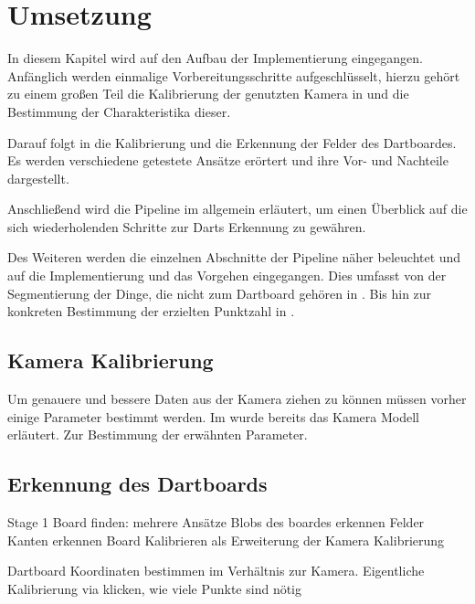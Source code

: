 
\chapter{Umsetzung}
\label{chap:coding}
In diesem Kapitel wird auf den Aufbau der Implementierung eingegangen. Anfänglich werden einmalige Vorbereitungsschritte aufgeschlüsselt, hierzu gehört zu einem großen Teil die Kalibrierung der genutzten Kamera in  und die Bestimmung der Charakteristika dieser. 

Darauf folgt in  die Kalibrierung und die Erkennung der Felder des Dartboardes. Es werden verschiedene getestete Ansätze erörtert und ihre Vor- und Nachteile dargestellt.

Anschließend wird die Pipeline im  allgemein erläutert, um einen Überblick auf die sich wiederholenden Schritte zur Darts Erkennung zu gewähren.

Des Weiteren werden die einzelnen Abschnitte der Pipeline näher beleuchtet und auf die Implementierung und das Vorgehen eingegangen. Dies umfasst von der Segmentierung der Dinge, die nicht zum Dartboard gehören in . Bis hin zur konkreten Bestimmung der erzielten Punktzahl in . 
\section{Kamera Kalibrierung}
\label{sec:camera}
Um genauere und bessere Daten aus der Kamera ziehen zu können müssen vorher einige Parameter bestimmt werden. Im  wurde bereits das Kamera Modell erläutert. 
Zur Bestimmung der erwähnten Parameter.  \autocite[5]{Zhang2000}

\section{Erkennung des Dartboards}
\label{sec:board}
Stage 1 Board finden:
     mehrere Ansätze
     Blobs des boardes erkennen
     Felder Kanten erkennen
     Board Kalibrieren als Erweiterung der Kamera Kalibrierung
        
        Dartboard Koordinaten bestimmen im Verhältnis zur Kamera.
       Eigentliche Kalibrierung via klicken,
       wie viele Punkte sind nötig
       
